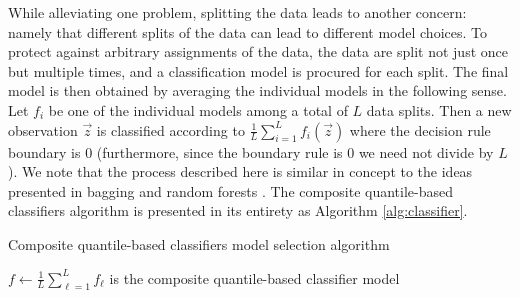While alleviating one problem, splitting the data leads to another concern:
namely that different splits of the data can lead to different model choices.
To protect against arbitrary assignments of the data, the data are split not
just once but multiple times, and a classification model is procured for each
split.  The final model is then obtained by averaging the individual models in
the following sense.  Let $f_i$ be one of the individual models among a total of
$L$ data splits.  Then a new observation $\vec{z}$ is classified according to
$\frac{1}{L} \sum_{i=1}^L f_i(\vec{z})$ where the decision rule boundary is 0
(furthermore, since the boundary rule is 0 we need not divide by $L$).  We note
that the process described here is similar in concept to the ideas presented in
bagging \cite{breiman1996} and random forests \cite{breiman2001}.  The composite
quantile-based classifiers algorithm is presented in its entirety as Algorithm
\ref{alg:classifier}.


\begin{algorithm}[ht]
  \caption{Composite quantile-based classifiers model selection algorithm}
  \label{alg:classifier}
  \DontPrintSemicolon
  \BlankLine


  $f \leftarrow \frac{1}{L} \sum_{\ell=1}^L f_{\ell}$ is the composite
  quantile-based classifier model

\end{algorithm}

